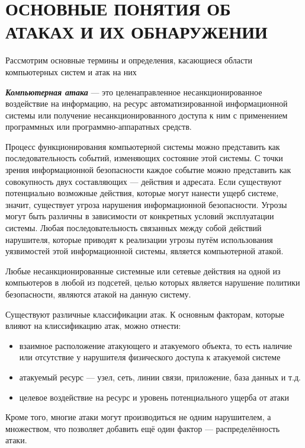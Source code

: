 \section{ОСНОВНЫЕ ПОНЯТИЯ ОБ АТАКАХ И ИХ ОБНАРУЖЕНИИ}

Рассмотрим основные термины и определения, касающиеся области компьютерных систем и атак на них

\textit{\textbf{Компьютерная атака}} --- это целенаправленное несанкционированное воздействие на информацию, на ресурс автоматизированной информационной системы или получение несанкционированного доступа к ним с применением программных или программно-аппаратных средств.

Процесс функционирования компьютерной системы можно представить как последовательность событий, изменяющих состояние этой системы. С точки зрения информационной безопасности каждое событие можно представить как совокупность двух составляющих --- действия и адресата. Если существуют потенциально возможные действия, которые могут нанести ущерб системе, значит, существует угроза нарушения информационной безопасности. Угрозы могут быть различны в зависимости от конкретных условий эксплуатации системы. Любая последовательность связанных между собой действий нарушителя, которые приводят к реализации угрозы путём использования уязвимостей этой информационной системы, является компьютерной атакой.

Любые несанкционированные системные или сетевые действия на одной из компьютеров в любой из подсетей, целью которых является нарушение политики безопасности, являются атакой на данную систему.

Существуют различные классификации атак. К основным факторам, которые влияют на клиссификацию атак, можно отнести:

\begin{itemize}

\item взаимное расположение атакующего и атакуемого объекта, то есть наличие или отсутствие у нарушителя физического доступа к атакуемой системе

\item атакуемый ресурс --- узел, сеть, линии связи, приложение, база данных и т.д.

\item целевое воздействие на ресурс и уровень потенциального ущерба от атаки

\end{itemize}

Кроме того, многие атаки могут производиться не одним нарушителем, а множеством, что позволяет добавить ещё один фактор --- распределённость атаки.

